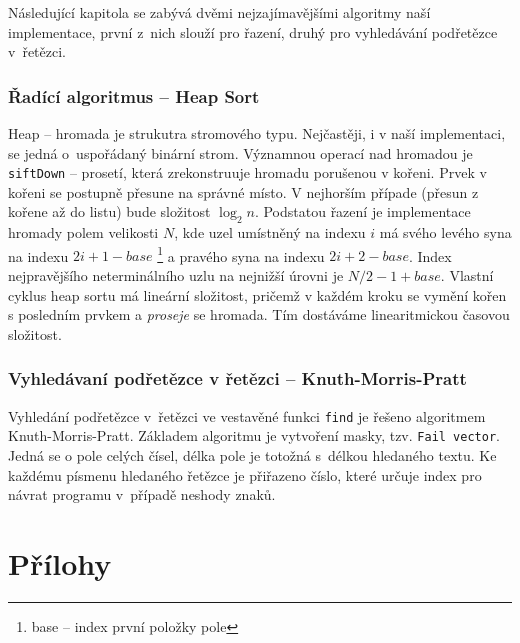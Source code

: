 \documentclass[a4paper, 12pt]{article}
\begin{document}
Následující kapitola se zabývá dvěmi nejzajímavějšími algoritmy naší
implementace, první z~nich slouží pro řazení, druhý pro vyhledávání
podřetězce v~řetězci.

\subsubsection{Řadící algoritmus -- Heap Sort}

Heap -- hromada je strukutra stromového typu. Nejčastěji, i v naší 
implementaci, se jedná o~uspořádaný binární strom. Významnou operací nad 
hromadou je \texttt{siftDown} -- prosetí, která zrekonstruuje hromadu 
porušenou v kořeni. Prvek v kořeni se postupně přesune na správné místo. V 
nejhorším případe (přesun z kořene až do listu) bude složitost $\log_2 n$. 
Podstatou řazení je implementace hromady polem velikosti $N$, kde uzel 
umístněný na indexu $i$ má svého levého syna na indexu $2i+1-base$ 
\footnote{base -- index první položky pole} a pravého syna na indexu 
$2i+2-base$. Index nejpravějšího neterminálního uzlu na nejnižší úrovni je
$N/2-1+base$. Vlastní cyklus heap sortu má lineární složitost, pričemž v každém 
kroku se vymění kořen s posledním prvkem a \textit{proseje} se hromada. Tím 
dostáváme linearitmickou časovou složitost.

\subsubsection{Vyhledávaní podřetězce v řetězci -- Knuth-Morris-Pratt}
Vyhledání podřetězce v~řetězci ve vestavěné funkci \texttt{find} je řešeno
algoritmem Knuth-Morris-Pratt. Základem algoritmu je vytvoření masky, tzv.
\texttt{Fail vector}. Jedná se o pole celých čísel, délka pole je totožná
s~délkou hledaného textu. Ke každému písmenu hledaného řetězce je přiřazeno
číslo, které určuje index pro návrat programu v~případě neshody znaků.

\newpage
\section{Přílohy} \label{prilohy}

\renewcommand\thesubsection{\thesection.\Alph{subsection}}

\end{document}
